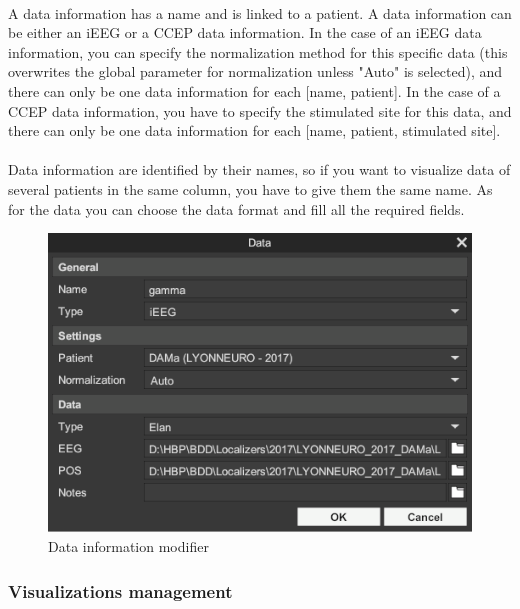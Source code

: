 \documentclass[a4paper]{article}
\begin{document}
\paragraph{} A data information has a name and is linked to a patient. A data information can be either an iEEG or a CCEP data information. In the case of an iEEG data information, you can specify the normalization method for this specific data (this overwrites the global parameter for normalization unless "Auto" is selected), and there can only be one data information for each [name, patient]. In the case of a CCEP data information, you have to specify the stimulated site for this data, and there can only be one data information for each [name, patient, stimulated site].
\paragraph{} Data information are identified by their names, so if you want to visualize data of several patients in the same column, you have to give them the same name. As for the data you can choose the data format and fill all the required fields.
\begin{figure}[H]
\begin{center}
\includegraphics[scale=0.5]{DataInfoModifier.png}
\end{center}
\caption{\label{dataInfoModifierUI}Data information modifier}
\end{figure}
\subsubsection{Visualizations management}
\end{document}
